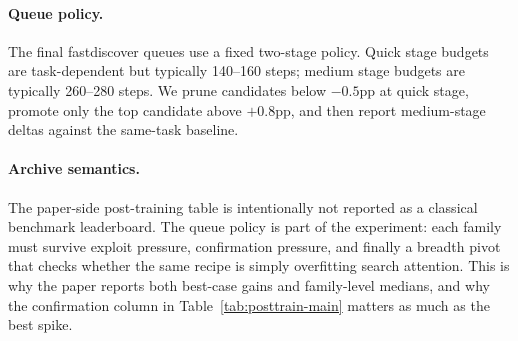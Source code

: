 \documentclass{article}
\begin{document}
\paragraph{Queue policy.}
The final fastdiscover queues use a fixed two-stage policy. Quick stage budgets are task-dependent but typically 140--160 steps; medium stage budgets are typically 260--280 steps. We prune candidates below $-0.5$pp at quick stage, promote only the top candidate above $+0.8$pp, and then report medium-stage deltas against the same-task baseline.


\begin{table}[t]
\centering
\small
\caption{Late-stage post-training audit protocol used by the paper-facing snapshot. These windows are not independent benchmark reruns; they are the exploit, confirmation, and breadth queues that decide which claims survive into the main table.}
\label{tab:audit-protocol}
\end{table}

\paragraph{Archive semantics.}
The paper-side post-training table is intentionally not reported as a classical benchmark leaderboard. The queue policy is part of the experiment: each family must survive exploit pressure, confirmation pressure, and finally a breadth pivot that checks whether the same recipe is simply overfitting search attention. This is why the paper reports both best-case gains and family-level medians, and why the confirmation column in Table~\ref{tab:posttrain-main} matters as much as the best spike.
\end{document}
